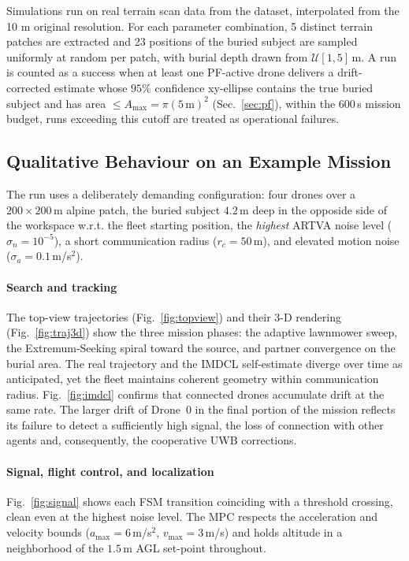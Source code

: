 \documentclass[journal,10pt,twocolumn]{IEEEtran}
\begin{document}
Simulations run on real terrain scan data from the dataset, interpolated from the 10 m original resolution.  For each parameter combination, 5 distinct
terrain patches are extracted and 23 positions of the buried subject are sampled
uniformly at random per patch, with burial depth drawn from
$\mathcal{U}[1,5]$\,m.  A run is counted as a success when at least one PF-active drone
delivers a drift-corrected estimate whose $95\%$ confidence xy-ellipse
contains the true buried subject and has area $\le A_{\max} = \pi(5\,\text{m})^2$
(Sec.~\ref{sec:pf}), within the $600$\,s mission budget, runs exceeding this cutoff
are treated as operational failures.

\subsection{Qualitative Behaviour on an Example Mission}
\label{sec:example}

The run uses a deliberately demanding configuration: four drones over a
$200\times200$\,m alpine patch, the buried subject $4.2$\,m deep in the opposide side of the workspace w.r.t. the fleet starting position, the \emph{highest} ARTVA noise level
($\sigma_n = 10^{-5}$), a short communication radius ($r_c = 50$\,m), and elevated motion noise ($\sigma_a = 0.1$\,m/s$^2$).

\paragraph{Search and tracking}
The top-view trajectories (Fig.~\ref{fig:topview}) and their 3-D rendering
(Fig.~\ref{fig:traj3d}) show the three mission phases: the adaptive
lawnmower sweep, the Extremum-Seeking spiral toward the source, and partner
convergence on the burial area. The real trajectory and the IMDCL
self-estimate diverge over time as anticipated, yet the fleet maintains
coherent geometry within communication radius. Fig.~\ref{fig:imdcl}
confirms that connected drones accumulate drift at the same rate. The
larger drift of Drone~0 in the final portion of the mission reflects its
failure to detect a sufficiently high signal, the loss of connection with other agents and, consequently, the cooperative
UWB corrections.

\paragraph{Signal, flight control, and localization}
Fig.~\ref{fig:signal} shows each FSM transition coinciding with a threshold
crossing, clean even at the highest noise level.  The MPC respects the
acceleration and velocity bounds ($a_{\max}=6$\,m/s$^2$, $v_{\max}=3$\,m/s)
and holds altitude in a neighborhood of the $1.5$\,m AGL set-point throughout.
\end{document}
